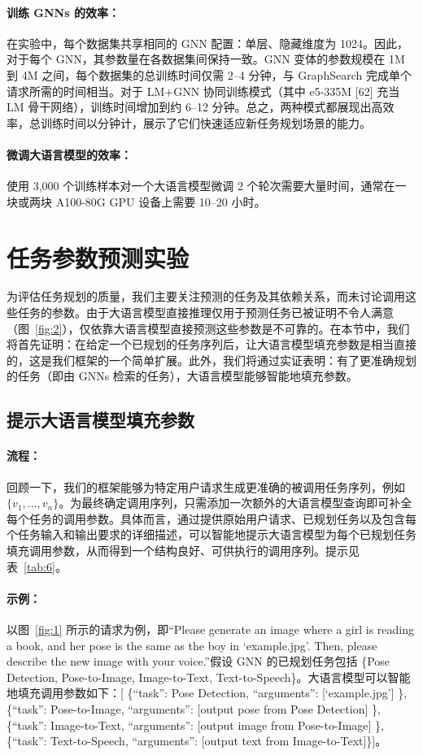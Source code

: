 \documentclass[11pt,UTF8,fontset=fandol]{ctexart}
\begin{document}
\paragraph{训练 GNNs 的效率：}在实验中，每个数据集共享相同的 GNN 配置：单层、隐藏维度为 1024。因此，对于每个 GNN，其参数量在各数据集间保持一致。GNN 变体的参数规模在 1M 到 4M 之间，每个数据集的总训练时间仅需 2--4 分钟，与 GraphSearch 完成单个请求所需的时间相当。对于 LM+GNN 协同训练模式（其中 e5-335M [62] 充当 LM 骨干网络），训练时间增加到约 6--12 分钟。总之，两种模式都展现出高效率，总训练时间以分钟计，展示了它们快速适应新任务规划场景的能力。

\paragraph{微调大语言模型的效率：}使用 3{,}000 个训练样本对一个大语言模型微调 2 个轮次需要大量时间，通常在一块或两块 A100-80G GPU 设备上需要 10--20 小时。

\section{任务参数预测实验}

为评估任务规划的质量，我们主要关注预测的任务及其依赖关系，而未讨论调用这些任务的参数。由于大语言模型直接推理仅用于预测任务已被证明不令人满意（图~\ref{fig:2}），仅依靠大语言模型直接预测这些参数是不可靠的。在本节中，我们将首先证明：在给定一个已规划的任务序列后，让大语言模型填充参数是相当直接的，这是我们框架的一个简单扩展。此外，我们将通过实证表明：有了更准确规划的任务（即由 GNNs 检索的任务），大语言模型能够智能地填充参数。

\subsection{提示大语言模型填充参数}

\paragraph{流程：}回顾一下，我们的框架能够为特定用户请求生成更准确的被调用任务序列，例如 $\{v_1, \ldots, v_n\}$。为最终确定调用序列，只需添加一次额外的大语言模型查询即可补全每个任务的调用参数。具体而言，通过提供原始用户请求、已规划任务以及包含每个任务输入和输出要求的详细描述，可以智能地提示大语言模型为每个已规划任务填充调用参数，从而得到一个结构良好、可供执行的调用序列。提示见表~\ref{tab:6}。

\paragraph{示例：}以图~\ref{fig:1} 所示的请求为例，即“Please generate an image where a girl is reading a book, and her pose is the same as the boy in `example.jpg'. Then, please describe the new image with your voice.”假设 GNN 的已规划任务包括 \{Pose Detection, Pose-to-Image, Image-to-Text, Text-to-Speech\}。大语言模型可以智能地填充调用参数如下：[ \{``task'': Pose Detection, ``arguments'': [`example.jpg'] \}, \{``task'': Pose-to-Image, ``arguments'': [output pose from Pose Detection] \}, \{``task'': Image-to-Text, ``arguments'': [output image from Pose-to-Image] \}, \{``task'': Text-to-Speech, ``arguments'': [output text from Image-to-Text]\}]。
\end{document}
